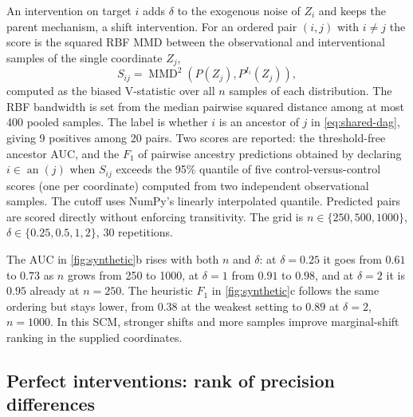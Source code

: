 \documentclass{article}
\newcommand{\an}{\operatorname{an}}
\newcommand{\MMD}{\operatorname{MMD}}
\begin{document}
An intervention on target $i$ adds $\delta$ to the exogenous noise of $Z_i$ and keeps the parent mechanism, a shift intervention. For an ordered pair $(i,j)$ with $i\neq j$ the score is the squared RBF MMD between the observational and interventional samples of the single coordinate $Z_j$,
\begin{equation}
    S_{ij}=\MMD^2\!\left(P(Z_j),P^{I_i}(Z_j)\right),
\end{equation}
computed as the biased V-statistic over all $n$ samples of each distribution. The RBF bandwidth is set from the median pairwise squared distance among at most 400 pooled samples. The label is whether $i$ is an ancestor of $j$ in \cref{eq:shared-dag}, giving 9 positives among 20 pairs. Two scores are reported: the threshold-free ancestor AUC, and the $F_1$ of pairwise ancestry predictions obtained by declaring $i\in\an(j)$ when $S_{ij}$ exceeds the 95\% quantile of five control-versus-control scores (one per coordinate) computed from two independent observational samples. The cutoff uses NumPy's linearly interpolated quantile. Predicted pairs are scored directly without enforcing transitivity. The grid is $n\in\{250,500,1000\}$, $\delta\in\{0.25,0.5,1,2\}$, 30 repetitions.

The AUC in \cref{fig:synthetic}b rises with both $n$ and $\delta$: at $\delta=0.25$ it goes from $0.61$ to $0.73$ as $n$ grows from 250 to 1000, at $\delta=1$ from $0.91$ to $0.98$, and at $\delta=2$ it is $0.95$ already at $n=250$. The heuristic $F_1$ in \cref{fig:synthetic}c follows the same ordering but stays lower, from $0.38$ at the weakest setting to $0.89$ at $\delta=2$, $n=1000$. In this SCM, stronger shifts and more samples improve marginal-shift ranking in the supplied coordinates.

\subsection{Perfect interventions: rank of precision differences}
\end{document}
